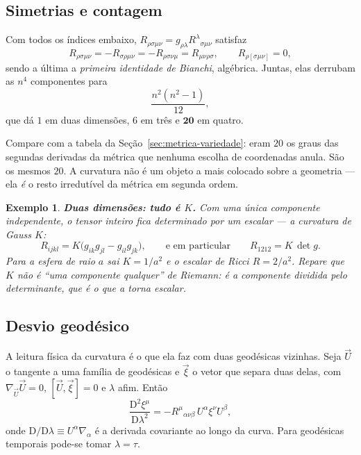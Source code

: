 \documentclass[12pt,a4paper,oneside]{book}
\theoremstyle{rgplain}
\newtheorem{example}{Exemplo}[chapter]
\theoremstyle{rgremark}
\newcommand{\D}{\mathrm{D}}
\begin{document}
\subsection*{Simetrias e contagem}

Com todos os índices embaixo, $R_{\rho\sigma\mu\nu}=g_{\rho\lambda}
R^\lambda{}_{\sigma\mu\nu}$ satisfaz
\begin{equation}
  R_{\rho\sigma\mu\nu}=-R_{\sigma\rho\mu\nu}=-R_{\rho\sigma\nu\mu}
  =R_{\mu\nu\rho\sigma} ,
  \qquad
  R_{\rho[\sigma\mu\nu]}=0 ,
  \label{eq:simetrias-riemann}
\end{equation}
sendo a última a \emph{primeira identidade de Bianchi}, algébrica. Juntas,
elas derrubam as $n^4$ componentes para
\begin{equation}
  \frac{n^2(n^2-1)}{12} ,
  \label{eq:contagem-riemann}
\end{equation}
que dá $1$ em duas dimensões, $6$ em três e $\mathbf{20}$ em quatro.

\begin{central}
Compare com a tabela da Seção~\ref{sec:metrica-variedade}: eram $20$ os graus
das segundas derivadas da métrica que nenhuma escolha de coordenadas anula.
São os mesmos $20$. A curvatura não é um objeto a mais colocado sobre a
geometria --- ela \emph{é} o resto irredutível da métrica em segunda ordem.
\end{central}

\begin{example}
\textbf{Duas dimensões: tudo é $K$.} Com uma única componente independente, o
tensor inteiro fica determinado por um escalar --- a curvatura de Gauss $K$:
\[
  R_{ijkl}=K\bigl(g_{ik}g_{jl}-g_{il}g_{jk}\bigr) ,
  \qquad\text{e em particular}\qquad
  R_{1212}=K\,\det g .
\]
Para a esfera de raio $a$ sai $K=1/a^2$ e o escalar de Ricci $R=2/a^2$.
Repare que $K$ não é ``uma componente qualquer'' de Riemann: é a componente
dividida pelo determinante, que é o que a torna escalar.
\end{example}

\subsection*{Desvio geodésico}

A leitura física da curvatura é o que ela faz com duas geodésicas vizinhas.
Seja $\vec U$ o tangente a uma família de geodésicas e $\vec\xi$ o vetor que
separa duas delas, com $\nabla_{\vec U}\vec U=0$, $[\vec U,\vec\xi]=0$ e
$\lambda$ afim. Então
\begin{equation}
  \frac{\D^2\xi^\mu}{\D\lambda^2}
  =-R^\mu{}_{\alpha\nu\beta}\,U^\alpha\xi^\nu U^\beta ,
  \label{eq:desvio-geodesico}
\end{equation}
onde $\D/\D\lambda\equiv U^\alpha\nabla_\alpha$ é a derivada covariante ao
longo da curva. Para geodésicas temporais pode-se tomar $\lambda=\tau$.
\end{document}
